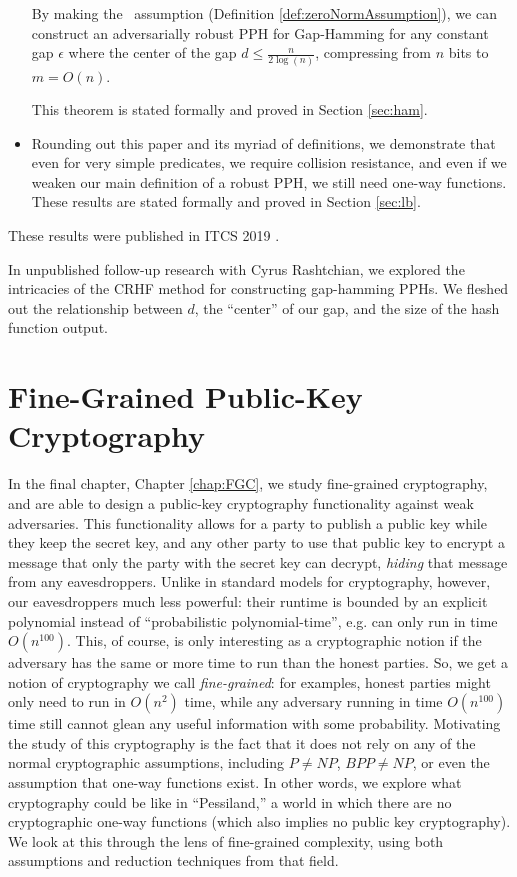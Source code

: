 \begin{itemize}
	\begin{theorem*}
		By making the \zeroNormAssumption~assumption (Definition \ref{def:zeroNormAssumption}), we can construct an adversarially robust PPH for Gap-Hamming for any constant gap $\epsilon$ where the center of the gap $d \le \frac{n}{2\log(n)}$, compressing from $n$ bits to $m = O(n)$.
	\end{theorem*}
	This theorem is stated formally and proved in Section \ref{sec:ham}.

	\item Rounding out this paper and its myriad of definitions, we demonstrate that even for very simple predicates, we require collision resistance, and even if we weaken our main definition of a robust PPH, we still need one-way functions.
	These results are stated formally and proved in Section \ref{sec:lb}.
\end{itemize}
These results were published in ITCS 2019 \cite{BLV19}.

In unpublished follow-up research with Cyrus Rashtchian, we explored the intricacies of the CRHF method for constructing gap-hamming PPHs. We fleshed out the relationship between $d$, the ``center'' of our gap, and the size of the hash function output.

\section{Fine-Grained Public-Key Cryptography}
In the final chapter, Chapter \ref{chap:FGC}, we study fine-grained cryptography, and are able to design a public-key cryptography functionality against weak adversaries. This functionality allows for a party to publish a public key while they keep the secret key, and any other party to use that public key to encrypt a message that only the party with the secret key can decrypt, \emph{hiding} that message from any eavesdroppers. Unlike in standard models for cryptography, however, our eavesdroppers much less powerful: their runtime is bounded by an explicit polynomial instead of ``probabilistic polynomial-time'', e.g. can only run in time $O(n^{100})$. This, of course, is only interesting as a cryptographic notion if the adversary has the same or more time to run than the honest parties. So, we get a notion of cryptography we call \emph{fine-grained}: for examples, honest parties might only need to run in $O(n^2)$ time, while any adversary running in time $O(n^{100})$ time still cannot glean any useful information with some probability. Motivating the study of this cryptography is the fact that it does not rely on any of the normal cryptographic assumptions, including $P \neq NP$, $BPP \neq NP$, or even the assumption that one-way functions exist. In other words, we explore what cryptography could be like in ``Pessiland,'' a world in which there are no cryptographic one-way functions (which also implies no public key cryptography). We look at this through the lens of fine-grained complexity, using both assumptions and reduction techniques from that field.

